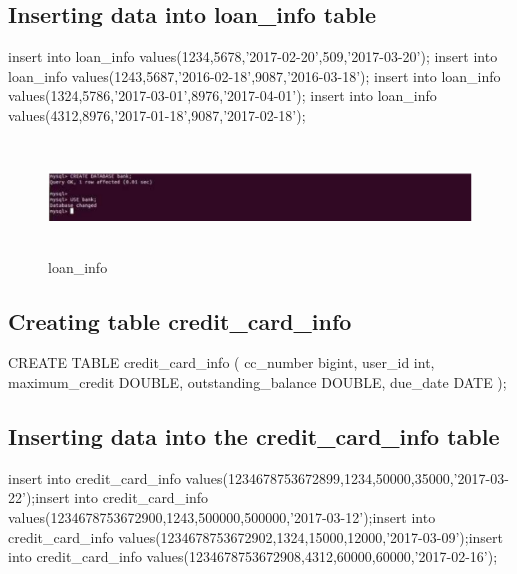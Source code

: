 \subsection{Inserting data into loan\_info table}
insert into loan\_info values(1234,5678,'2017-02-20',509,'2017-03-20');\newline
insert into loan\_info values(1243,5687,'2016-02-18',9087,'2016-03-18');\newline
insert into loan\_info values(1324,5786,'2017-03-01',8976,'2017-04-01');\newline
insert into loan\_info values(4312,8976,'2017-01-18',9087,'2017-02-18');\newline
\begin{figure}[H]
\centering
\includegraphics[width=12cm,height=3cm]{1.png}
    \caption{loan\_info}
\end{figure}
   \subsection{Creating table credit\_card\_info}
   CREATE TABLE credit\_card\_info \newline
( \newline
cc\_number bigint, \newline
user\_id int, \newline
maximum\_credit DOUBLE, \newline
outstanding\_balance DOUBLE, \newline
due\_date DATE \newline
); \newline
 
 \subsection{Inserting data into the credit\_card\_info table}
 insert into credit\_card\_info values(1234678753672899,1234,50000,35000,'2017-03-22');\newline insert
into credit\_card\_info values(1234678753672900,1243,500000,500000,'2017-03-12');\newline insert
into credit\_card\_info values(1234678753672902,1324,15000,12000,'2017-03-09');\newline insert into
credit\_card\_info values(1234678753672908,4312,60000,60000,'2017-02-16');\newline

